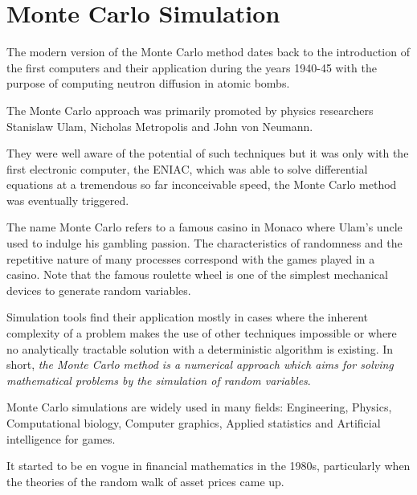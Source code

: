 \chapter{Monte Carlo Simulation}
\label{cap:montecarlo}

The modern version of the Monte Carlo method dates back to the introduction of the first computers and their application during the years 1940-45 with the purpose of computing neutron diffusion in atomic bombs.

The Monte Carlo approach was primarily promoted by physics researchers Stanislaw Ulam, Nicholas Metropolis and John von Neumann.

They were well aware of the potential of such techniques but it was only with the first electronic computer, the ENIAC, which was able to solve differential equations at a tremendous so far inconceivable speed, the Monte Carlo method was eventually triggered.

The name Monte Carlo refers to a famous casino in Monaco where Ulam's uncle used to indulge his gambling passion. 
The characteristics of randomness and the repetitive nature of many processes correspond with the games played in a casino. Note that the famous roulette wheel is one of the simplest mechanical devices to generate random variables.

Simulation tools find their application mostly in cases where the inherent complexity of a problem makes the use of other techniques impossible or where no analytically tractable solution with a
deterministic algorithm is existing. In short, \emph{the Monte Carlo method is a numerical approach which aims for solving mathematical problems by the simulation of random variables}.

Monte Carlo simulations are widely used in many fields: Engineering, Physics, Computational biology, Computer graphics, Applied statistics and Artificial intelligence for games.

It started to be en vogue in financial mathematics in the 1980s, particularly when the theories of the random walk of asset prices came up.



